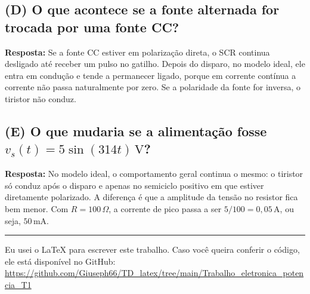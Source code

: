 \documentclass[12pt,a4paper]{article}
\newcommand{\resposta}[1]{\textbf{Resposta:} #1}
\begin{document}
\subsection*{(D) O que acontece se a fonte alternada for trocada por uma fonte CC?}

\resposta{Se a fonte CC estiver em polariza\c{c}\~ao direta, o SCR continua desligado at\'e receber um pulso no gatilho. Depois do disparo, no modelo ideal, ele entra em condu\c{c}\~ao e tende a permanecer ligado, porque em corrente cont\'inua a corrente n\~ao passa naturalmente por zero. Se a polaridade da fonte for inversa, o tiristor n\~ao conduz.}

\subsection*{(E) O que mudaria se a alimenta\c{c}\~ao fosse \(v_s(t)=5\sin(314t)\,\text{V}\)?}

\resposta{No modelo ideal, o comportamento geral continua o mesmo: o tiristor s\'o conduz ap\'os o disparo e apenas no semiciclo positivo em que estiver diretamente polarizado. A diferen\c{c}a \'e que a amplitude da tens\~ao no resistor fica bem menor. Com \(R=100\,\Omega\), a corrente de pico passa a ser \(5/100 = 0{,}05\,\text{A}\), ou seja, \(50\,\text{mA}\).}

\vfill
\hrule
\vspace{0.3em}
{\footnotesize
Eu usei o \LaTeX{} para escrever este trabalho. Caso voc\^e queira conferir o c\'odigo, ele est\'a dispon\'ivel no GitHub: \url{https://github.com/Giuseph66/TD_latex/tree/main/Trabalho_eletronica_potencia_T1}
}
\end{document}
